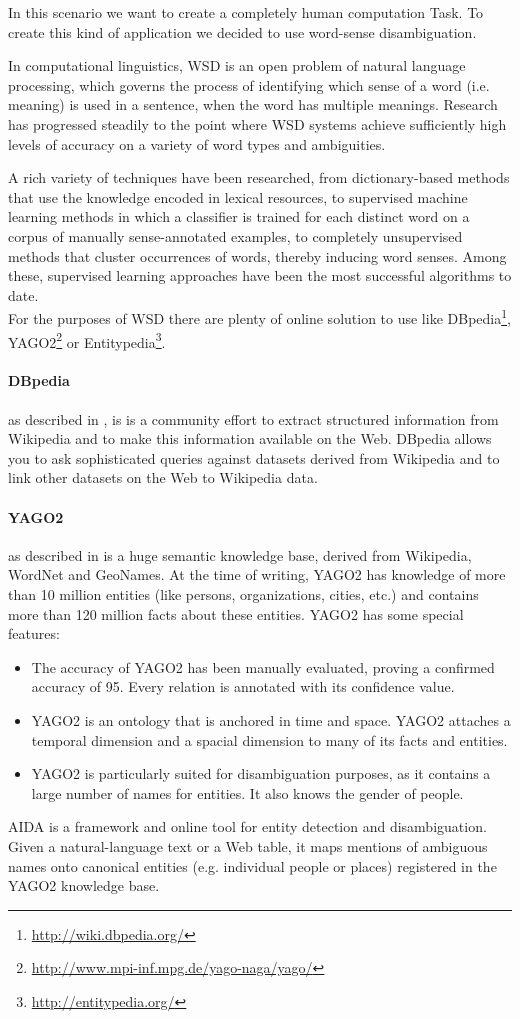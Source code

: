
% 
In this scenario we want to create a completely human computation Task. To 
create this kind of application we decided to use word-sense disambiguation.

In computational linguistics, \ac{WSD} is an open problem of natural language
processing, which governs the process of identifying which sense of a word
(i.e. meaning) is used in a sentence, when the word has multiple meanings.
Research has progressed steadily to the point where \ac{WSD} systems achieve
sufficiently high levels of accuracy on a variety of word types and ambiguities.

A rich variety of techniques have been researched, from dictionary-based methods
that use the knowledge encoded in lexical resources, to supervised machine
learning methods in which a classifier is trained for each distinct word on a
corpus of manually sense-annotated examples, to completely unsupervised methods
that cluster occurrences of words, thereby inducing word senses. Among these,
supervised learning approaches have been the most successful algorithms to date.\\

For the purposes of \ac{WSD} there are plenty of online solution to use like
DBpedia\footnote{\url{http://wiki.dbpedia.org/}},
YAGO2\footnote{\url{http://www.mpi-inf.mpg.de/yago-naga/yago/}} or
Entitypedia\footnote{\url{http://entitypedia.org/}}.


\paragraph{DBpedia} as described in \cite{auer2007dbpedia}, is is a community
effort to extract structured information from Wikipedia and to make this
information available on the Web. DBpedia allows you to ask sophisticated queries
against datasets derived from Wikipedia and to link other datasets on the Web to
Wikipedia data.

\paragraph{YAGO2} as described in \cite{hoffart2010yago2} is a huge semantic
knowledge base, derived from Wikipedia, WordNet and GeoNames. At the time of
writing, YAGO2 has knowledge of more than 10 million entities (like persons,
organizations, cities, etc.) and contains more than 120 million facts about these
entities. YAGO2 has some special features:
\begin{itemize}
    \item The accuracy of YAGO2 has been manually evaluated, proving a confirmed
    accuracy of 95. Every relation is annotated with its confidence value.
    \item YAGO2 is an ontology that is anchored in time and space. YAGO2 attaches
    a temporal dimension and a spacial dimension to many of its facts and entities.
    \item YAGO2 is particularly suited for disambiguation purposes, as it
    contains a large number of names for entities. It also knows the gender of
    people.
\end{itemize}

\noindent AIDA is a framework and online tool for entity detection and disambiguation. Given
a natural-language text or a Web table, it maps mentions of ambiguous names onto
canonical entities (e.g. individual people or places) registered in the YAGO2
knowledge base. 